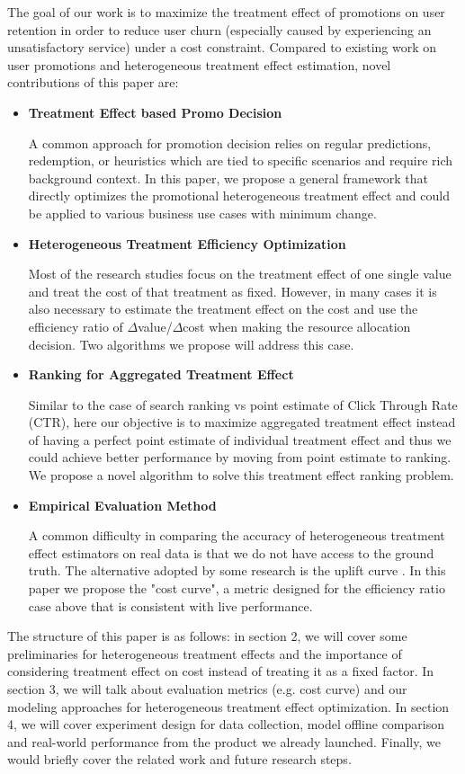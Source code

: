 The goal of our work is to maximize the treatment effect of promotions on user retention in order to reduce user churn (especially caused by experiencing an unsatisfactory service) under a cost constraint. Compared to existing work on user promotions and heterogeneous treatment effect estimation, novel contributions of this paper are:
\begin{itemize}
\item \textbf{Treatment Effect based Promo Decision} 

A common approach for promotion decision relies on regular predictions, redemption, or heuristics which are tied to specific scenarios and require rich background context. In this paper, we propose a general framework that directly optimizes the promotional heterogeneous treatment effect and could be applied to various business use cases with minimum change.

\item \textbf{Heterogeneous Treatment Efficiency Optimization} 

Most of the research studies focus on the treatment effect of one single value and treat the cost of that treatment as fixed. However, in many cases it is also necessary to estimate the treatment effect on the cost and use the efficiency ratio of $\Delta$value/$\Delta$cost when making the resource allocation decision. Two algorithms we propose will address this case.

\item \textbf{Ranking for Aggregated Treatment Effect} 

Similar to the case of search ranking vs point estimate of Click Through Rate (CTR), here our objective is to maximize aggregated treatment effect instead of having a perfect point estimate of individual treatment effect and thus we could achieve better performance by moving from point estimate to ranking. We propose a novel algorithm to solve this treatment effect ranking problem.

\item \textbf{Empirical Evaluation Method} 

A common difficulty in comparing the accuracy of heterogeneous treatment effect estimators on real data is that we do not have access to the ground truth. The alternative adopted by some research is the uplift curve \cite{rzepakowski2012decision}. In this paper we propose the "cost curve", a metric designed for the efficiency ratio case above that is consistent with live performance.

\end{itemize}
The structure of this paper is as follows: in section 2, we will cover some preliminaries for heterogeneous treatment effects and the importance of considering treatment effect on cost instead of treating it as a fixed factor. In section 3, we will talk about evaluation metrics (e.g. cost curve) and our modeling approaches for heterogeneous treatment effect optimization. In section 4, we will cover experiment design for data collection, model offline comparison and real-world performance from the product we already launched. Finally, we would briefly cover the related work and future research steps.

